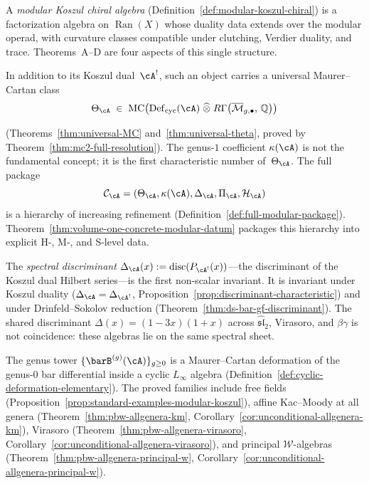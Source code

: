 A \emph{modular Koszul chiral algebra}
(Definition~\ref{def:modular-koszul-chiral}) is a factorization
algebra on $\operatorname{Ran}(X)$ whose duality data extends over
the modular operad, with curvature classes compatible under
clutching, Verdier duality, and trace.  Theorems~A--D are four
aspects of this single structure.

In addition to its Koszul dual~$\cA^!$, such an object carries a
universal Maurer--Cartan class
\begin{equation}\label{eq:universal-MC}
\Theta_\cA \;\in\;
\operatorname{MC}\!\left(
  \operatorname{Def}_{\mathrm{cyc}}(\cA)
  \;\widehat{\otimes}\;
  R\Gamma\!\left(\overline{\mathcal{M}}_{g,\bullet},\,
  \mathbb{Q}\right)
\right)
\end{equation}

(Theorems~\ref{thm:universal-MC}
and~\ref{thm:universal-theta}, proved by
Theorem~\ref{thm:mc2-full-resolution}).  The genus-$1$ coefficient
$\kappa(\cA)$ is not the fundamental concept; it is the first
characteristic number of~$\Theta_\cA$.  The full package
\[
\mathcal{C}_\cA
=
(\Theta_\cA, \kappa(\cA), \Delta_\cA, \Pi_\cA, \mathcal{H}_\cA)
\]
is a hierarchy of increasing refinement
(Definition~\ref{def:full-modular-package}).
Theorem~\ref{thm:volume-one-concrete-modular-datum} packages this
hierarchy into explicit H-, M-, and S-level data.

The \emph{spectral discriminant}
$\Delta_\cA(x) := \operatorname{disc}(P_{\cA^!}(x))$---the
discriminant of the Koszul dual Hilbert series---is the first
non-scalar invariant.  It is invariant under Koszul duality
($\Delta_\cA = \Delta_{\cA^!}$,
Proposition~\ref{prop:discriminant-characteristic})
and under Drinfeld--Sokolov reduction
(Theorem~\ref{thm:ds-bar-gf-discriminant}).  The shared
discriminant $\Delta(x) = (1-3x)(1+x)$ across
$\widehat{\mathfrak{sl}}_2$, Virasoro, and $\beta\gamma$ is not
coincidence: these algebras lie on the same spectral sheet.

The genus tower $\{\barB^{(g)}(\cA)\}_{g \geq 0}$ is a
Maurer--Cartan deformation of the genus-$0$ bar differential
inside a cyclic $L_\infty$ algebra
(Definition~\ref{def:cyclic-deformation-elementary}).  The proved
families include free fields
(Proposition~\ref{prop:standard-examples-modular-koszul}), affine
Kac--Moody at all genera
(Theorem~\ref{thm:pbw-allgenera-km},
Corollary~\ref{cor:unconditional-allgenera-km}), Virasoro
(Theorem~\ref{thm:pbw-allgenera-virasoro},
Corollary~\ref{cor:unconditional-allgenera-virasoro}), and
principal $\mathcal{W}$-algebras
(Theorem~\ref{thm:pbw-allgenera-principal-w},
Corollary~\ref{cor:unconditional-allgenera-principal-w}).

